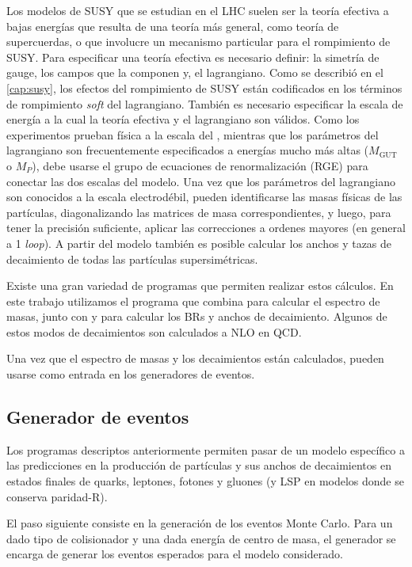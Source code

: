 Los modelos de SUSY que se estudian en el LHC suelen ser la teoría efectiva a
bajas energías que resulta de una teoría más general, como teoría de
supercuerdas, o que involucre un mecanismo particular para el rompimiento de
SUSY. Para especificar una teoría efectiva es necesario definir: la simetría de
gauge, los campos que la componen y, el lagrangiano. Como se describió en el
\cref{cap:susy}, los efectos del rompimiento de SUSY están codificados en los
términos de rompimiento \emph{soft} del lagrangiano. También es necesario especificar
la escala de energía a la cual la teoría efectiva y el lagrangiano son válidos.
Como los experimentos prueban física a la escala del {\tev}, mientras que los
parámetros del lagrangiano son frecuentemente especificados a energías mucho más
altas ($M_\text{GUT}$ o $M_P$), debe usarse el grupo de ecuaciones de
renormalización (RGE) para conectar las dos escalas del modelo. Una vez que los
parámetros del lagrangiano son conocidos a la escala electrodébil, pueden
identificarse las masas físicas de las partículas, diagonalizando las matrices
de masa correspondientes, y luego, para tener la precisión suficiente, aplicar
las correcciones a ordenes mayores (en general a 1 \emph{loop}). A partir del modelo
también es posible calcular los anchos y tazas de decaimiento de todas las
partículas supersimétricas.

Existe una gran variedad de programas que permiten realizar estos cálculos. En
este trabajo utilizamos el programa {\susyhit}\cite{Djouadi:2006bz} que combina
{\suspect}\cite{Djouadi2007426} para calcular el espectro de masas, junto con
{\sdecay}\cite{Muhlleitner:2004mka} y {\hdecay}\cite{Djouadi:1997yw} para
calcular los BRs y anchos de decaimiento. Algunos de estos modos de decaimientos
son calculados a NLO en QCD.

Una vez que el espectro de masas y los decaimientos están calculados,
pueden usarse como entrada en los generadores de eventos.


\subsection{Generador de eventos}

Los programas descriptos anteriormente permiten pasar de un modelo específico a las
predicciones en la producción de partículas y sus anchos de decaimientos en
estados finales de quarks, leptones, fotones y gluones (y LSP en modelos donde
se conserva paridad-R).

El paso siguiente consiste en la generación de los eventos Monte Carlo.
Para un dado tipo de colisionador y una dada energía de centro de masa,
el generador se encarga de generar los eventos esperados para el modelo
considerado.


